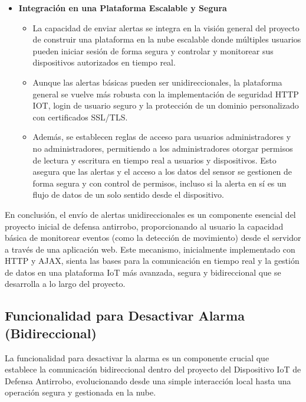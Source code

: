 \documentclass{report}
\begin{document}
\begin{itemize}
\begin{itemize}
\begin{itemize}
        \end{itemize}
        \item \textbf{Integración en una Plataforma Escalable y Segura}
        \begin{itemize}
            \item La capacidad de enviar alertas se integra en la visión general del proyecto de construir una plataforma en la nube escalable donde múltiples 
            usuarios pueden iniciar sesión de forma segura y controlar y monitorear sus dispositivos autorizados en tiempo real.
            \item Aunque las alertas básicas pueden ser unidireccionales, la plataforma general se vuelve más robusta con la implementación de seguridad HTTP 
            IOT, login de usuario seguro y la protección de un dominio personalizado con certificados SSL/TLS.
            \item Además, se establecen reglas de acceso para usuarios administradores y no administradores, permitiendo a los administradores otorgar permisos 
            de lectura y escritura en tiempo real a usuarios y dispositivos. Esto asegura que las alertas y el acceso a los datos del sensor se gestionen de 
            forma segura y con control de permisos, incluso si la alerta en sí es un flujo de datos de un solo sentido desde el dispositivo.
        \end{itemize}
    \end{itemize}
\end{itemize}
En conclusión, el envío de alertas unidireccionales es un componente esencial del proyecto inicial de defensa antirrobo, proporcionando al usuario la 
capacidad básica de monitorear eventos (como la detección de movimiento) desde el servidor a través de una aplicación web. Este mecanismo, inicialmente 
implementado con HTTP y AJAX, sienta las bases para la comunicación en tiempo real y la gestión de datos en una plataforma IoT más avanzada, segura y 
bidireccional que se desarrolla a lo largo del proyecto.

\subsection{Funcionalidad para Desactivar Alarma (Bidireccional)}
La funcionalidad para desactivar la alarma es un componente crucial que establece la comunicación bidireccional dentro del proyecto del Dispositivo IoT 
de Defensa Antirrobo, evolucionando desde una simple interacción local hasta una operación segura y gestionada en la nube.
\end{document}
